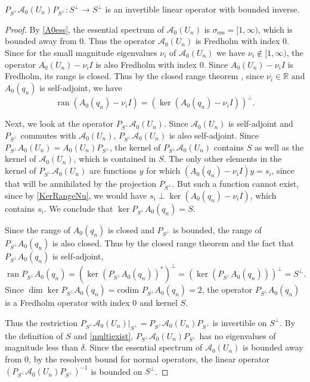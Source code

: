 \documentclass[review,onefignum,onetabnum]{siamart171218}
\newcommand{\R}{\mathbb{R}}
\def\dim{\mathop\mathrm{dim}\nolimits}
\def\ker{\mathop\mathrm{ker}\nolimits}
\def\Ran{\mathop\mathrm{ran}\nolimits}
\newcommand{\calA}{\mathcal{A}}
\begin{document}

\begin{lemma}\label{PA0inv}
$P_{S^\perp} \calA_0(U_n) P_{S^\perp}: S^\perp \rightarrow S^\perp$ is an invertible linear operator with bounded inverse.
\end{lemma}

\begin{proof}
By \cref{A0ess}, the essential spectrum of $\calA_0(U_n)$ is $\sigma_{\text{ess}} = [1, \infty)$, which is bounded away from 0. Thus the operator $\calA_0(U_n)$ is Fredholm with index 0. Since for the small magnitude eigenvalues $\nu_i$ of $\calA_0(U_n)$ we have $\nu_i \notin [1, \infty)$, the operator $A_0(U_n)  - \nu_i I$ is also Fredholm with index 0. Since $A_0(U_n)  - \nu_i I$ is Fredholm, its range is closed. Thus by the closed range theorem \cite[p.~205]{Yosida}, since $\nu_i \in \R$ and $A_0(q_n)$ is self-adjoint, we have
\begin{equation}\label{KerRangeNu}
\Ran (A_0(q_n) - \nu_i I) = \left(\ker (A_0(q_n) - \nu_i I)\right)^\perp.
\end{equation}

Next, we look at the operator $P_{S^\perp} \calA_0(U_n)$. Since $\calA_0(U_n)$ is self-adjoint and $P_{S^\perp}$ commutes with $\calA_0(U_n)$, $P_{S^\perp} \calA_0(U_n)$ is also self-adjoint. Since $P_{S^\perp} A_0(U_n) = A_0(U_n) P_{S^\perp}$, the kernel of $P_{S^\perp} \calA_0(U_n)$ contains $S$ as well as the kernel of $\calA_0(U_n)$, which is contained in $S$. The only other elements in the kernel of $P_{S^\perp} \calA_0(U_n)$ are functions $y$ for which $(A_0(q_n) - \nu_i I) y = s_i$, since that will be annihilated by the projection $P_{S^\perp}$. But such a function cannot exist, since by \eqref{KerRangeNu}, we would have $s_i \perp \ker (A_0(q_n) - \nu_i I)$, which contains $s_i$. We conclude that $\ker P_{S^\perp} A_0(q_n) = S$.

Since the range of $A_0(q_n)$ is closed and $P_{S^\perp}$ is bounded, the range of $P_{S^\perp} A_0(q_n)$ is also closed. Thus by the closed range theorem and the fact that $P_{S^\perp} A_0(q_n)$ is self-adjoint,
\[
\Ran P_{S^\perp} A_0(q_n) = (\ker (P_{S^\perp} A_0(q_n))^*)^\perp = (\ker (P_{S^\perp} A_0(q_n)))^\perp = S^\perp.
\]
Since $\dim \ker P_{S^\perp} A_0(q_n) = \text{codim } P_{S^\perp} A_0(q_n) = 2$, the operator $P_{S^\perp} A_0(q_n)$ is a Fredholm operator with index 0 and kernel $S$.

Thus the restriction $P_{S^\perp} \calA_0(U_n)|_{S^\perp} = P_{S^\perp} \calA_0(U_n) P_{S^\perp}$ is invertible on $S^\perp$. By the definition of $S$ and \cref{multiexist}, $P_{S^\perp}\calA_0(U_n)P_{S^\perp}$ has no eigenvalues of magnitude less than $\delta$. Since the essential spectrum of $\calA_0(U_n)$ is bounded away from 0, by the resolvent bound for normal operators, the linear operator $(P_{S^\perp} \calA_0(U_n)P_{S^\perp})^{-1}$ is bounded on $S^\perp$.
\end{proof}
\end{document}
